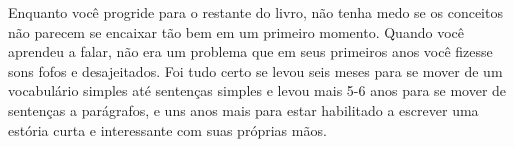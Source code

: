 Enquanto você progride para o restante do livro, não tenha medo se os conceitos
não parecem se encaixar tão bem em um primeiro momento. Quando você aprendeu a falar, não era um problema que em seus primeiros anos você fizesse sons fofos e desajeitados. Foi tudo certo se levou seis meses para se mover de um
vocabulário simples até sentenças simples e levou mais 5-6 anos para se mover de sentenças a
parágrafos, e uns anos mais para estar habilitado a escrever uma
estória curta e interessante com suas próprias mãos.


%

